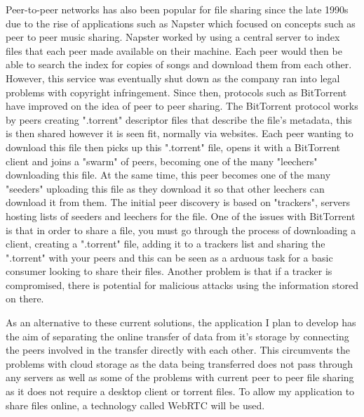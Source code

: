 \documentclass[]{report}
\begin{document}
	Peer-to-peer networks has also been popular for file sharing since the late 1990s due to the rise of applications such as Napster which focused on concepts such as peer to peer music sharing. Napster worked by using a central server to index files that each peer made available on their machine. Each peer would then be able to search the index for copies of songs and download them from each other. However, this service was eventually shut down as the company ran into legal problems with copyright infringement. Since then, protocols such as BitTorrent have improved on the idea of peer to peer sharing. The BitTorrent protocol works by peers creating ".torrent" descriptor files that describe the file's metadata, this is then shared however it is seen fit, normally via websites. Each peer wanting to download this file then picks up this ".torrent" file, opens it with a BitTorrent client and joins a "swarm" of peers, becoming one of the many "leechers" downloading this file. At the same time, this peer becomes one of the many "seeders" uploading this file as they download it so that other leechers can download it from them. The initial peer discovery is based on "trackers", servers hosting lists of seeders and leechers for the file. One of the issues with BitTorrent is that in order to share a file, you must go through the process of downloading a client, creating a ".torrent" file, adding it to a trackers list and sharing the ".torrent" with your peers and this can be seen as a arduous task for a basic consumer looking to share their files. Another problem is that if a tracker is compromised, there is potential for malicious attacks using the information stored on there.

	As an alternative to these current solutions, the application I plan to develop has the aim of separating the online transfer of data from it's storage by connecting the peers involved in the transfer directly with each other. This circumvents the problems with cloud storage as the data being transferred does not pass through any servers as well as some of the problems with current peer to peer file sharing as it does not require a desktop client or torrent files. To allow my application to share files online, a technology called WebRTC will be used.
	
\end{document}
